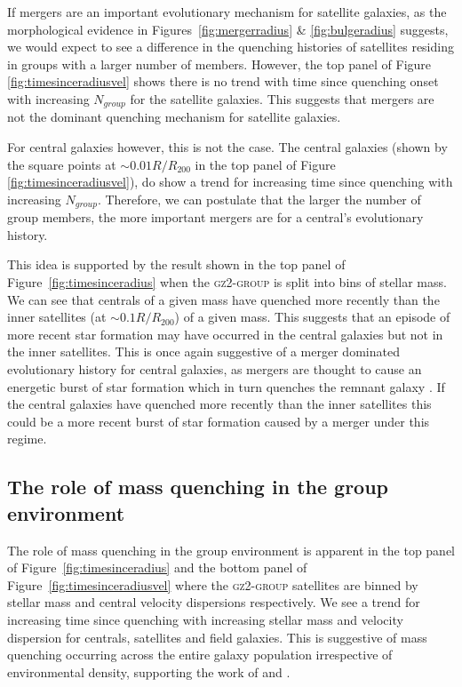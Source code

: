 \documentclass[useAMS,usenatbib]{mn2e}
\begin{document}
If mergers are an important evolutionary mechanism for satellite galaxies, as the morphological evidence in Figures~\ref{fig:mergerradius} \& \ref{fig:bulgeradius} suggests, we would expect to see a difference in the quenching histories of satellites residing in groups with a larger number of members. However, the top panel of Figure \ref{fig:timesinceradiusvel} shows there is no trend with time since quenching onset with increasing $N_{group}$ for the satellite galaxies. This suggests that mergers are not the dominant quenching mechanism for satellite galaxies.

For central galaxies however, this is not the case. The central galaxies (shown by the square points at $\sim 0.01 R/R_{200}$ in the top panel of Figure \ref{fig:timesinceradiusvel}), do show a trend for increasing time since quenching with increasing $N_{group}$. Therefore, we can postulate that the larger the number of group members, the more important mergers are for a central's evolutionary history. 

This idea is supported by the result shown in the top panel of Figure~\ref{fig:timesinceradius} when the \textsc{gz2-group} is split into bins of stellar mass. We can see that centrals of a given mass have quenched more recently than the inner satellites (at $\sim0.1R/R_{200}$) of a given mass. This suggests that an episode of more recent star formation may have occurred in the central galaxies but not in the inner satellites. This is once again suggestive of a merger dominated evolutionary history for central galaxies, as mergers are thought to cause an energetic burst of star formation which in turn quenches the remnant galaxy \citep{hopkins05, treister12, pontzen16}. If the central galaxies have quenched more recently than the inner satellites this could be a more recent burst of star formation caused by a merger under this regime. 


\subsection{The role of mass quenching in the group environment}\label{sec:rolemassenv}

The role of mass quenching in the group environment is apparent in the top panel of Figure~\ref{fig:timesinceradius} and the bottom panel of Figure~\ref{fig:timesinceradiusvel} where the \textsc{gz2-group} satellites are binned by stellar mass and central velocity dispersions respectively. We see a trend for increasing time since quenching with increasing stellar mass and velocity dispersion for centrals, satellites and field galaxies. This is suggestive of mass quenching occurring across the entire galaxy population irrespective of environmental density, supporting the work of \citet{Peng10, gabor10, peng12} and \citet{darvish16}.
\end{document}
